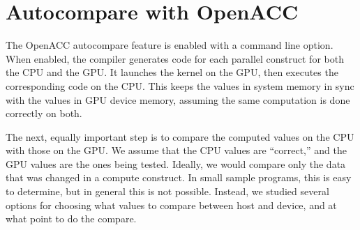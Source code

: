 \section{Autocompare with OpenACC}

The OpenACC autocompare feature is enabled with a command line option.
When enabled, the compiler generates code for each parallel construct for both the CPU and the GPU.
It launches the kernel on the GPU, then executes the corresponding code on the CPU.
This keeps the values in system memory in sync with the values in GPU device memory, assuming the same computation is done correctly on both.

The next, equally important step is to compare the computed values on the CPU with those on the GPU.
We assume that the CPU values are ``correct,'' and the GPU values are the ones being tested.
Ideally, we would compare only the data that was changed in a compute construct.
In small sample programs, this is easy to determine, but in general this is not possible.
Instead, we studied several options for choosing what values to compare between host and device, and at what point to do the compare.
